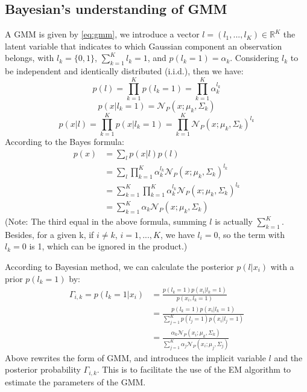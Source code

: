\documentclass[12pt,a4paper]{article}
\begin{document}
\subsection{Bayesian's understanding of GMM}
A GMM is given by \eqref{eq:gmm}, we introduce a vector $l= (l_1,...,l_K) \in \mathbb{R}^K$ the latent variable that indicates to which Gaussian component an observation belongs, with $l_k = \{0,1\}$, $\sum_{k =1}^K l_k = 1$, and $p(l_k = 1) = \alpha_k$.
Considering $l_k$ to be independent and identically distributed (i.i.d.), then we have:
\begin{equation}
    p(l) = \prod_{k = 1}^K p(l_k = 1) = \prod_{k = 1}^K \alpha_k^{l_k} 
\end{equation}
\begin{equation}
    p(x|l_k = 1) = \mathcal{N}_P(x;\mu_k,\Sigma_k)
\end{equation}
\begin{equation}
    p(x|l) = \prod_{k = 1}^K p(x|l_k = 1) = \prod_{k = 1}^K \mathcal{N}_P(x;\mu_k,\Sigma_k) ^{l_k}
\end{equation}
According to the Bayes formula:
\begin{equation}
    \begin{aligned}
    p(x) &= \sum_l p(x|l)p(l) \\&= \sum_l \prod_{k = 1}^K 
    \alpha_k^{l_k}\mathcal{N}_P(x;\mu_k,\Sigma_k)^{l_k}
    \\&=\sum_{k = 1}^K \prod_{k = 1}^K \alpha_k^{l_k}\mathcal{N}_P(x;\mu_k,\Sigma_k)^{l_k}
    \\&= \sum_{k = 1}^K \alpha_k\mathcal{N}_P(x;\mu_k,\Sigma_k)
\end{aligned}
\end{equation}
(Note: The third equal in the above formula, summing $l$ is actually $\sum_{k = 1}^K$. Besides, for a given k, if $i \ne k$, $i = 1,...,K$, we have $l_i = 0$, so the term with $l_k = 0$ is 1, which can be ignored in the product.)
    
According to Bayesian method, we can calculate the posterior $p(l|x_i)$ with a prior $p(l_k=1)$ by:
\begin{equation}
    \begin{aligned}
    \Gamma_{i,k}=p(l_k = 1|x_i) &= \frac{p(l_k =1) p(x_i|l_k = 1)}{p(x_i,l_k = 1)}
    \\&= \frac{p(l_k =1) p(x_i|l_k = 1)}{\sum_{j = 1}^K p(l_j=1)p(x_i|l_j = 1)}
    \\& = \frac{\alpha_k \mathcal{N}_P(x_i;\mu_k,\Sigma_k)}{\sum_{j = 1}^K \alpha_j\mathcal{N}_P(x_i;\mu_j,\Sigma_j)}
\end{aligned}
\end{equation}
Above rewrites the form of GMM, and introduces the implicit variable $l$ and the posterior probability $\Gamma_{i,k}$.
This is to facilitate the use of the EM algorithm to estimate the parameters of the GMM.
\end{document}
